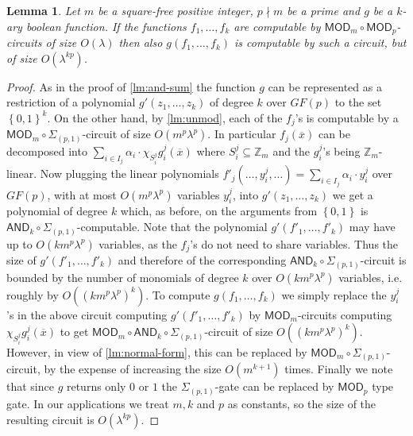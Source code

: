 \documentclass[11pt,a4paper]{amsart}
\newtheorem{lm}{Lemma}[section]
\newcommand{\set}[1]{{\left\{ {#1} \right\} }}
\newcommand{\ci}{\subseteq}
\newcounter{note}
\renewcommand{\o}[1]{\overline {#1}}
\newcommand{\z}{\mathbb{Z}}
\newcommand{\sumpk}[2]{\Sigma_{(#1,#2)}}
\newcommand{\csize}{\lambda}
\newcommand{\ccand}{\mathsf{AND}}
\newcommand{\ccmod}{\mathsf{MOD}}
\begin{document}
\begin{lm}\label{lm:apply_func}
Let $m$ be a square-free positive integer, $p\nmid m$ be a prime and $g$ be a $k$-ary boolean function.
If the functions $f_1, \ldots, f_k$ are computable by
$\ccmod_m\circ\ccmod_p$-circuits
of size $O(\lambda)$
then also $g(f_1,\ldots,f_k)$ is computable by such a circuit,
but of size $O(\lambda^{kp})$.
\end{lm}
\begin{proof}
As in the proof of \cref{lm:and-sum} the function $g$ can be represented as a restriction of a polynomial $g'(z_1,\ldots,z_k)$ of degree $k$ over $GF(p)$ to the set $\set{0,1}^k$.
On the other hand, by \cref{lm:unmod}, each of the $f_j$'s is computable by a $\ccmod_m\circ\sumpk{p}{1}$-circuit of size $O(m^p\csize^p)$.
In particular $f_j(\o x)$ can be decomposed into
\(
\sum_{i\in I_j} \alpha_i\cdot\chi_{S_i^j}g_i^j(\o x)
\)
where $S_i^j\ci\z_m$ and the $g_i^j$'s being $\z_m$-linear.
Now plugging the linear polynomials
\(
f'_j(\ldots,y_i^j,\ldots)=\sum_{i\in I_j} \alpha_i\cdot y_i^j
\)
over $GF(p)$, with at most $O(m^p\csize^p)$ variables $y_i^j$, into $g'(z_1,\ldots,z_k)$
we get a polynomial of degree $k$ which, as before,
on the arguments from $\set{0,1}$ is $\ccand_k\circ\sumpk{p}{1}$-computable.
Note that the polynomial $g'(f'_1,\ldots,f'_k)$ may have up to $O(km^p\csize^p)$ variables, as the $f_j$'s do not need to share variables.
Thus the size of $g'(f'_1,\ldots,f'_k)$ and therefore of the corresponding  $\ccand_k\circ\sumpk{p}{1}$-circuit is bounded by the number of monomials of degree $k$ over $O(km^p\csize^p)$ variables, i.e. roughly by $O((km^p\csize^p)^k)$.
To compute $g(f_1,\ldots,f_k)$ we simply replace the $y_i^j$'s in the above circuit computing
$g'(f'_1,\ldots,f'_k)$ by $\ccmod_m$-circuits computing $\chi_{S_i^j}g_i^j(\o x)$
to get $\ccmod_m\circ\ccand_k\circ\sumpk{p}{1}$-circuit of size $O((km^p\csize^p)^k)$.
However, in view of \cref{lm:normal-form}, this can be replaced by $\ccmod_m\circ\sumpk{p}{1}$-circuit, by the expense of increasing the size $O(m^{k+1})$ times.
Finally we note that since $g$ returns only $0$ or $1$ the $\sumpk{p}{1}$-gate can be replaced by
$\ccmod_p$ type gate. In our applications we treat $m,k$ and $p$ as constants, so the size of the resulting circuit is $O(\lambda^{kp})$.
\end{proof}
\end{document}
